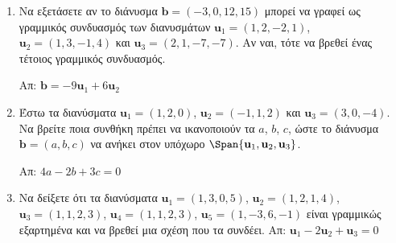 \begin{enumerate}
  \item Να εξετάσετε αν το διάνυσμα $ \mathbf{b} = (-3,0,12,15) $ μπορεί να γραφεί 
    ως γραμμικός συνδυασμός των διανυσμάτων $ \mathbf{u}_{1} = (1,2,-2,1) $, 
    $ \mathbf{u}_{2} = (1,3,-1,4) $ και $ \mathbf{u}_{3} = (2,1,-7,-7) $. 
    Αν ναι, τότε να βρεθεί ένας τέτοιος γραμμικός συνδυασμός.

    \hfill Απ: $ \mathbf{b} = -9 \mathbf{u}_{1} + 6 \mathbf{u}_{2} $ 

  \item\label{ask:eksart3} Έστω τα διανύσματα $ \mathbf{u}_{1} = (1,2,0) $, 
    $ \mathbf{u}_{2} = (-1,1,2) $ 
    και $ \mathbf{u}_{3} = (3,0,-4) $. Να βρείτε ποια συνθήκη πρέπει να ικανοποιούν τα 
    $a$, $b$, $c$, ώστε το διάνυσμα $ \mathbf{b} = (a,b,c) $ να ανήκει στον υπόχωρο 
    $ \Span \{ \mathbf{u}_{1}, \mathbf{u}_{2}, \mathbf{u}_{3} \} $.

    \hfill Απ: $ 4a -2b + 3c = 0 $ 

  \item\label{ask:synd} Να δείξετε ότι τα διανύσματα $ \mathbf{u}_{1} = (1,3,0,5) $, 
    $ \mathbf{u}_{2} = (1,2,1,4) $, $ \mathbf{u}_{3} = (1,1,2,3)$, 
    $ \mathbf{u}_{4} = (1,1,2,3) $, $ \mathbf{u}_{5} = (1,-3,6,-1) $ 
    είναι γραμμικώς εξαρτημένα και να βρεθεί μια σχέση που τα συνδέει. 
    \hfill Απ: $ \mathbf{u}_{1} - 2 \mathbf{u}_{2} + \mathbf{u}_{3} = 0 $ 

\end{enumerate}




